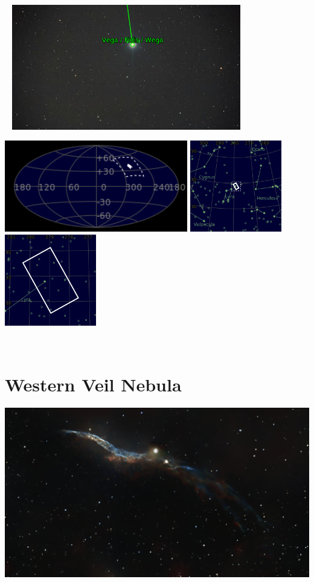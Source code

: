 \begin{center}
 \ \newpage
\includegraphics[width=0.75\textwidth]{../Imaging//Annotated/Vega_Star_Annotated.jpg}

\includegraphics[height=4cm]{../Imaging//Annotated/Vega_Star_Globe.jpg}
\includegraphics[height=4cm]{../Imaging//Annotated/Vega_Star_Close.jpg}
\includegraphics[height=4cm]{../Imaging//Annotated/Vega_Star_Closer.jpg}
\end{center}
\ \\\section{Western Veil Nebula}
\includegraphics[width=\textwidth]{../Imaging//Original/Western_Veil_Nebula.jpg}
